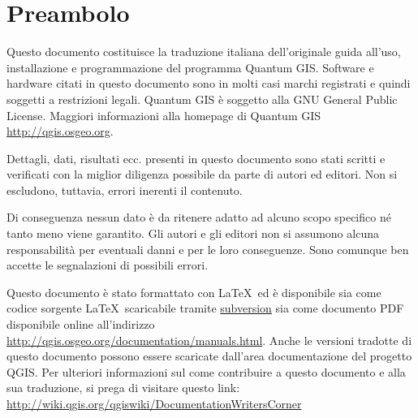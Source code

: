 \newcommand\qgistip[1]{\raggedright\small{#1}}
\renewcommand{\topfraction}{0.85}
\renewcommand{\textfraction}{0.1}
\renewcommand{\floatpagefraction}{0.75}

\thispagestyle{empty}


\section*{Preambolo}


Questo documento costituisce la traduzione italiana dell'originale
guida all'uso, installazione e programmazione del programma Quantum
GIS. Software e hardware citati in questo documento sono in
molti casi marchi registrati e quindi soggetti a restrizioni
legali. Quantum GIS è soggetto alla GNU General Public License. Maggiori
informazioni alla homepage di Quantum GIS
\url{http://qgis.osgeo.org}.

Dettagli, dati, risultati ecc. presenti in questo documento sono stati
scritti e verificati con la miglior diligenza possibile da parte di autori
ed editori. Non si escludono, tuttavia, errori inerenti il contenuto.

Di conseguenza nessun dato è da ritenere adatto ad alcuno scopo specifico
né tanto meno viene garantito. Gli autori e gli editori non si assumono alcuna responsabilità per eventuali
danni e per le loro conseguenze. Sono comunque ben accette le segnalazioni
di possibili errori.

Questo documento è stato formattato con \LaTeX~ed è disponibile sia come codice sorgente \LaTeX~scaricabile
tramite \href{http://wiki.qgis.org/qgiswiki/DocumentationWritersCorner}{subversion} sia
come documento PDF disponibile online all'indirizzo \url{http://qgis.osgeo.org/documentation/manuals.html}.
Anche le versioni tradotte di questo documento possono essere scaricate dall'area documentazione
del progetto QGIS. Per ulteriori informazioni sul come contribuire a questo documento e alla sua
traduzione, si prega di visitare questo link: \url{http://wiki.qgis.org/qgiswiki/DocumentationWritersCorner}

